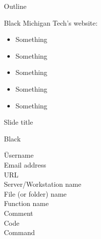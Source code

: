\documentclass{MichiganTech}
\begin{document}
\maketitle

\nontitleslidesetup


%
\begin{frame}[t]{Outline}
  \vspace*{0.10in}
  \begin{reference}{4mm}{85.5mm}{Black}
    Michigan Tech's website:
    \href{http://www.mtu.edu}{}
  \end{reference}

  \begin{itemize}
    \item Something
    \item Something
    \item Something
    \item Something
    \item Something
  \end{itemize}
\end{frame}


%
\begin{frame}[t]{Slide title}
  \vspace*{0.10in}
  \begin{reference}{4mm}{85.5mm}{Black}
    \;
  \end{reference}

  \vspace*{-0.10in}
  \begin{tabbing}
      \hspace{1.75in}       \= Username\\
                   \> Email address\\
                \> URL\\
          \> Server/Workstation name\\
            \> File (or folder) name\\
              \> Function name\\
     \> Comment\\
          \> Code\\
                \> Command
  \end{tabbing}
\end{frame}
\end{document}
